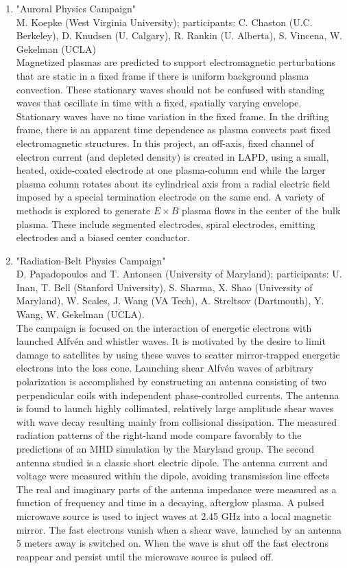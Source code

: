 \documentclass[11pt]{article}
\begin{document}
\begin{enumerate}
\item "Auroral Physics Campaign" \\ M. Koepke (West Virginia
  University); participants: C. Chaston (U.C. Berkeley), D. Knudsen
  (U. Calgary), R. Rankin (U. Alberta), S. Vincena, W. Gekelman
  (UCLA) \\ Magnetized plasmas are
  predicted to support electromagnetic perturbations that are static
  in a fixed frame if there is uniform background plasma
  convection. These stationary waves should not be confused with
  standing waves that oscillate in time with a fixed, spatially
  varying envelope. Stationary waves have no time variation in the
  fixed frame. In the drifting frame, there is an apparent time
  dependence as plasma convects past fixed electromagnetic
  structures. In this project, an off-axis, fixed channel of electron
  current (and depleted density) is created in LAPD, using a small, heated, oxide-coated electrode at one
  plasma-column end while the larger plasma column rotates about its
  cylindrical axis from a radial electric field imposed by a special
  termination electrode on the same end. A variety of methods is
  explored to generate $E\times B$ plasma flows in the center of the bulk
  plasma. These include segmented electrodes, spiral electrodes,
  emitting electrodes and a biased center conductor.
 
 
\item "Radiation-Belt Physics Campaign"\\ D. Papadopoulos and
  T. Antonsen (University of Maryland); participants: U. Inan, T. Bell
  (Stanford University), S. Sharma, X. Shao (University of Maryland),
  W. Scales, J. Wang (VA Tech), A. Streltsov (Dartmouth), Y. Wang,
  W. Gekelman (UCLA).\\ The
  campaign is focused on the interaction of energetic electrons with
  launched Alfv\'{e}n and whistler waves. It is motivated by the
  desire to limit damage to satellites by using these waves to scatter
  mirror-trapped energetic electrons into the loss cone. Launching
  shear Alfv\'{e}n waves of arbitrary polarization is accomplished by
  constructing an antenna consisting of two perpendicular coils with
  independent phase-controlled currents. The antenna is found to
  launch highly collimated, relatively large amplitude shear waves
  with wave decay resulting mainly from collisional dissipation. The
  measured radiation patterns of the right-hand mode compare
  favorably to the predictions of an MHD simulation by the Maryland
  group. The second antenna studied is a classic short electric
  dipole. The antenna current and voltage were measured within the
  dipole, avoiding transmission line effects The real and imaginary
  parts of the antenna impedance were measured as a function of
  frequency and time in a decaying, afterglow plasma. A pulsed
  microwave source is used to inject
  waves at 2.45 GHz into a local magnetic mirror.
  The fast electrons vanish when a shear wave, launched by an
  antenna 5 meters away is switched on. When the wave is shut off the
  fast electrons reappear and persist until the microwave source is
  pulsed off.


\end{enumerate}
\end{document}
